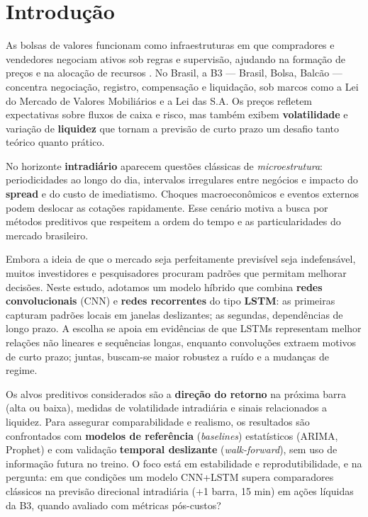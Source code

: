 \section{Introdução}
\label{sec:introducao}

As bolsas de valores funcionam como infraestruturas em que compradores e vendedores negociam ativos sob regras e supervisão, ajudando na formação de preços e na alocação de recursos \cite{mishkin2018,bodie2021}. No Brasil, a B3 --- Brasil, Bolsa, Balcão --- concentra negociação, registro, compensação e liquidação, sob marcos como a Lei do Mercado de Valores Mobiliários e a Lei das S.A. Os preços refletem expectativas sobre fluxos de caixa e risco, mas também exibem \textbf{volatilidade} e variação de \textbf{liquidez} que tornam a previsão de curto prazo um desafio tanto teórico quanto prático.

No horizonte \textbf{intradiário} aparecem questões clássicas de \emph{microestrutura}: periodicidades ao longo do dia, intervalos irregulares entre negócios e impacto do \textbf{spread} e do custo de imediatismo. Choques macroeconômicos e eventos externos podem deslocar as cotações rapidamente. Esse cenário motiva a busca por métodos preditivos que respeitem a ordem do tempo e as particularidades do mercado brasileiro.

Embora a ideia de que o mercado seja perfeitamente previsível seja indefensável, muitos investidores e pesquisadores procuram padrões que permitam melhorar decisões. Neste estudo, adotamos um modelo híbrido que combina \textbf{redes convolucionais} (CNN) e \textbf{redes recorrentes} do tipo \textbf{LSTM}: as primeiras capturam padrões locais em janelas deslizantes; as segundas, dependências de longo prazo. A escolha se apoia em evidências de que LSTMs representam melhor relações não lineares e sequências longas, enquanto convoluções extraem motivos de curto prazo; juntas, buscam-se maior robustez a ruído e a mudanças de regime.

Os alvos preditivos considerados são a \textbf{direção do retorno} na próxima barra (alta ou baixa), medidas de volatilidade intradiária e sinais relacionados a liquidez. Para assegurar comparabilidade e realismo, os resultados são confrontados com \textbf{modelos de referência} (\emph{baselines}) estatísticos (ARIMA, Prophet) e com validação \textbf{temporal deslizante} (\emph{walk-forward}), sem uso de informação futura no treino. O foco está em estabilidade e reprodutibilidade, e na pergunta: em que condições um modelo CNN+LSTM supera comparadores clássicos na previsão direcional intradiária (+1 barra, 15 min) em ações líquidas da B3, quando avaliado com métricas pós-custos?

